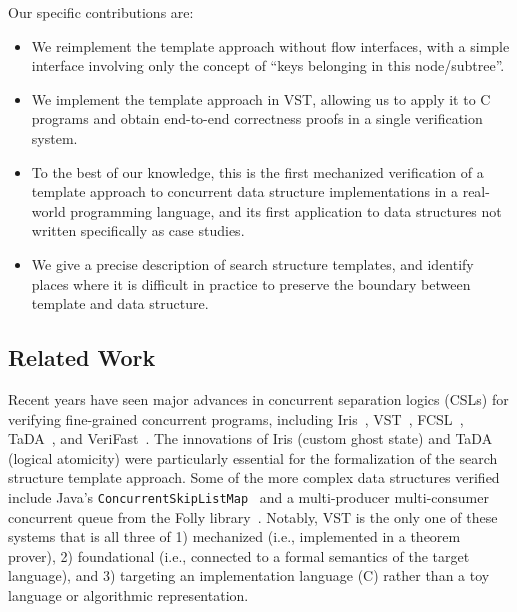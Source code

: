 \documentclass[sigplan,10pt,anonymous,review]{acmart}\settopmatter{printfolios=true,printccs=false,printacmref=false}
\begin{document}
Our specific contributions are:
\begin{itemize}
	\item We reimplement the template approach without flow interfaces, with a simple interface involving only the concept of ``keys belonging in this node/subtree''.
	\item We implement the template approach in VST, allowing us to apply it to C programs and obtain end-to-end correctness proofs in a single verification system.
	\item To the best of our knowledge, this is the first mechanized verification of a template approach to concurrent data structure implementations in a real-world programming language, and its first application to data structures not written specifically as case studies.
	\item We give a precise description of search structure templates, and identify places where it is difficult in practice to preserve the boundary between template and data structure.
\end{itemize}

\subsection*{Related Work}
Recent years have seen major advances in concurrent separation logics (CSLs) for verifying fine-grained concurrent programs, including Iris~\cite{iris}, VST~\cite{plcc,iris-vst-arxiv}, FCSL~\cite{fcsl}, TaDA~\cite{tada}, and VeriFast~\cite{verifast-conc}. The innovations of Iris (custom ghost state) and TaDA (logical atomicity) were particularly essential for the formalization of the search structure template approach. Some of the more complex data structures verified include Java's \lstinline{ConcurrentSkipListMap}~\cite{Xiong2017Abstract} and a multi-producer multi-consumer concurrent queue from the Folly library~\cite{iris-folly}. Notably, VST is the only one of these systems that is all three of 1) mechanized (i.e., implemented in a theorem prover), 2) foundational (i.e., connected to a formal semantics of the target language), and 3) targeting an implementation language (C) rather than a toy language or algorithmic representation. %

\end{document}

